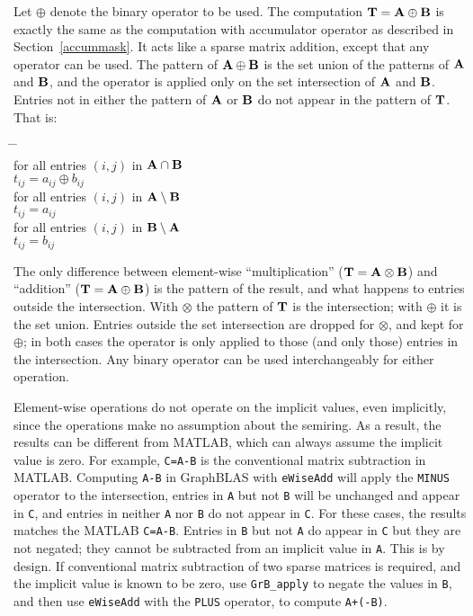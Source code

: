 \documentclass[12pt]{article}
\begin{document}
Let $\oplus$ denote the binary operator to be used.  The computation ${\bf T =
A \oplus B}$ is exactly the same as the computation with accumulator operator
as described in Section~\ref{accummask}.  It acts like a sparse matrix
addition, except that any operator can be used.  The pattern of ${\bf A \oplus
B}$ is the set union of the patterns of ${\bf A}$ and ${\bf B}$, and the
operator is applied only on the set intersection of ${\bf A}$ and ${\bf B}$.
Entries not in either the pattern of ${\bf A}$ or ${\bf B}$ do not appear in
the pattern of ${\bf T}$.  That is:
    \vspace{-0.2in}
    {\small
    \begin{tabbing}
    \hspace{2em} \= \hspace{2em} \= \hspace{2em} \= \\
    \> for all entries $(i,j)$ in ${\bf A \cap B}$ \\
    \> \> $t_{ij} = a_{ij} \oplus b_{ij}$ \\
    \> for all entries $(i,j)$ in ${\bf A \setminus B}$ \\
    \> \> $t_{ij} = a_{ij}$ \\
    \> for all entries $(i,j)$ in ${\bf B \setminus A}$ \\
    \> \> $t_{ij} = b_{ij}$
    \end{tabbing}
    }

The only difference between element-wise ``multiplication'' (${\bf T =A \otimes
B}$) and ``addition'' (${\bf T = A \oplus B}$) is the pattern of the result,
and what happens to entries outside the intersection.  With $\otimes$ the
pattern of ${\bf T}$ is the intersection; with $\oplus$ it is the set union.
Entries outside the set intersection are dropped for $\otimes$, and kept for
$\oplus$; in both cases the operator is only applied to those (and only those)
entries in the intersection.  Any binary operator can be used interchangeably
for either operation.

Element-wise operations do not operate on the implicit values, even implicitly,
since the operations make no assumption about the semiring.  As a result, the
results can be different from MATLAB, which can always assume the implicit
value is zero.  For example, \verb'C=A-B' is the conventional matrix
subtraction in MATLAB.  Computing \verb'A-B' in GraphBLAS with \verb'eWiseAdd'
will apply the \verb'MINUS' operator to the intersection, entries in \verb'A'
but not \verb'B' will be unchanged and appear in \verb'C', and entries in
neither \verb'A' nor \verb'B' do not appear in \verb'C'.  For these cases, the
results matches the MATLAB \verb'C=A-B'.  Entries in \verb'B' but not \verb'A'
do appear in \verb'C' but they are not negated; they cannot be subtracted from
an implicit value in \verb'A'.  This is by design.  If conventional matrix
subtraction of two sparse matrices is required, and the implicit value is known
to be zero, use \verb'GrB_apply' to negate the values in \verb'B', and then
use \verb'eWiseAdd' with the \verb'PLUS' operator, to compute \verb'A+(-B)'.
\end{document}
